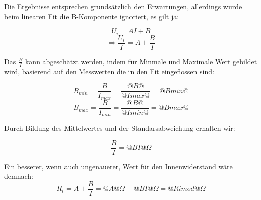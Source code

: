 \documentclass{article}
\begin{document}
Die Ergebnisse entsprechen grundsätzlich den Erwartungen, allerdings wurde beim linearen 
Fit die B-Komponente ignoriert, es gilt ja: 

$$U_i=AI+B$$
$$\Rightarrow \frac{U_i}{I}=A+\frac{B}{I}$$

Das $\frac{B}{I}$ kann abgeschätzt werden, indem für Minmale und Maximale 
Wert gebildet wird, basierend auf den Messwerten die in den Fit eingeflossen sind: 

$$B_{min}=\frac{B}{I_{max}}=\frac{@B@}{@Imax@}=@Bmin@$$
$$B_{max}=\frac{B}{I_{min}}=\frac{@B@}{@Imin@}=@Bmax@$$

Durch Bildung des Mittelwertes und der Standarsabweichung erhalten wir: 

$$\frac{B}{I}=@BI@ \Omega$$

Ein besserer, wenn auch ungenauerer, Wert für den Innenwiderstand wäre demnach: 
$$R_i=A+\frac{B}{I}=@A@\Omega+@BI@\Omega=@Rimod@\Omega$$


\end{document}
